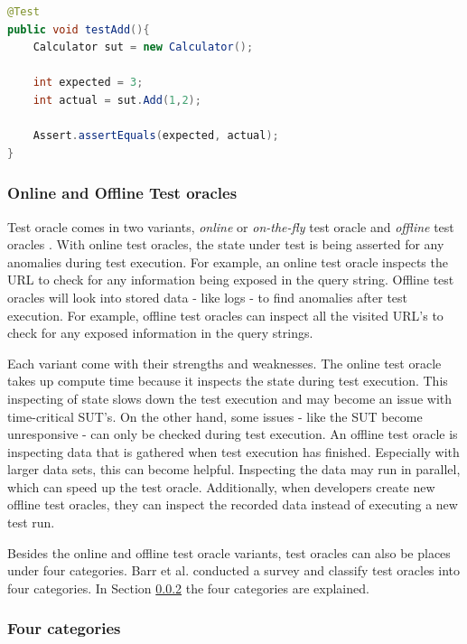 \begin{lstlisting}[language=Java, caption=Assertion, label=code:assert]
@Test
public void testAdd(){
    Calculator sut = new Calculator();

    int expected = 3;
    int actual = sut.Add(1,2);

    Assert.assertEquals(expected, actual);
}
\end{lstlisting}

\subsubsection{Online and Offline Test oracles}
    Test oracle comes in two variants, \emph{online} or \emph{on-the-fly} test oracle and \emph{offline} test oracles \cite{VosAho2021}. With online test oracles, the state under test is being asserted for any anomalies during test execution. For example,  an online test oracle inspects the URL to check for any information being exposed in the query string. Offline test oracles will look into stored data - like logs - to find anomalies after test execution. For example, offline test oracles can inspect all the visited URL's to check for any exposed information in the query strings. 

    Each variant come with their strengths and weaknesses. The online test oracle takes up compute time because it inspects the state during test execution. This inspecting of state slows down the test execution and may become an issue with time-critical SUT's. On the other hand, some issues - like the SUT become unresponsive - can only be checked during test execution. An offline test oracle is inspecting data that is gathered when test execution has finished. Especially with larger data sets, this can become helpful. Inspecting the data may run in parallel, which can speed up the test oracle. Additionally, when developers create new offline test oracles, they can inspect the recorded data instead of executing a new test run. \cite{de2019offline}

    Besides the online and offline test oracle variants, test oracles can also be places under four categories. Barr et al. conducted a survey and classify test oracles into four categories. In Section \ref{to:four-cat} the four categories are explained. 

    \subsubsection{Four categories} \label{to:four-cat}
 
